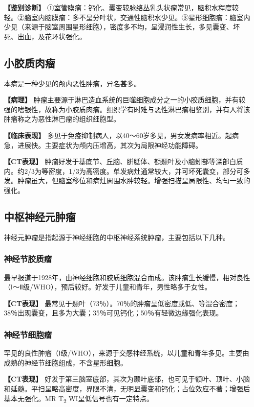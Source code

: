 \textbf{【鉴别诊断】}
①室管膜瘤：钙化、囊变较脉络丛乳头状瘤常见，脑积水程度较轻。②脑室内脑膜瘤：多不呈分叶状，交通性脑积水少见。③星形细胞瘤：脑室内少见（来源于脑室周围星形细胞），密度多不均，呈浸润性生长，多见囊变、坏死、出血，及花环状强化。

\subsection{小胶质肉瘤}

本病是一种少见的颅内恶性肿瘤，异名甚多。

\textbf{【病理】}
肿瘤主要源于淋巴造血系统的巨噬细胞成分之一的小胶质细胞，并有较强的嗜银性，故称为小胶质肉瘤。组织学有时难与恶性淋巴瘤相鉴别，并有人将该肿瘤称之为恶性淋巴瘤的组织细胞型。

\textbf{【临床表现】}
多见于免疫抑制病人，以40～60岁多见，男女发病率相近。起病急，进展快。主要症状为颅内压增高，其次为局限神经功能障碍。

\textbf{【CT表现】}
肿瘤好发于基底节、丘脑、胼胝体、额颞叶及小脑蚓部等深部白质内。约2/3为等密度，1/3为高密度。单发病灶通常较大，并可坏死囊变，部分可多发。肿瘤虽大，但脑室移位和病灶周围水肿较轻。增强扫描呈局限性、均匀一致的强化。

\subsection{中枢神经元肿瘤}

神经元肿瘤是指起源于神经细胞的中枢神经系统肿瘤，主要包括以下几种。

\subsubsection{神经节胶质瘤}

最早报道于1928年，由神经细胞和胶质细胞混合而成。该肿瘤生长缓慢，相对良性（Ⅰ～Ⅱ级/WHO），预后较好。好发于儿童和青年，男性略多于女性。

\textbf{【CT表现】}
最常见于颞叶（73％）。70％的肿瘤呈低密度或低、等混合密度；38％出现囊变，且多为大囊；35％可见钙化；50％有轻微边缘强化表现。

\subsubsection{神经节细胞瘤}

罕见的良性肿瘤（Ⅰ级/WHO），来源于交感神经系统，以儿童和青年多见。主要由成熟的神经节细胞组成，不含星形细胞。

\textbf{【CT表现】}
好发于第三脑室底部，其次为颞叶底部，也可见于额叶、顶叶、小脑和延髓。平扫呈略高密度，界限不清，无明显囊变和钙化；占位效应不著；增强后基本无强化。MR
T\textsubscript{2} WI呈低信号也有一定特点。


